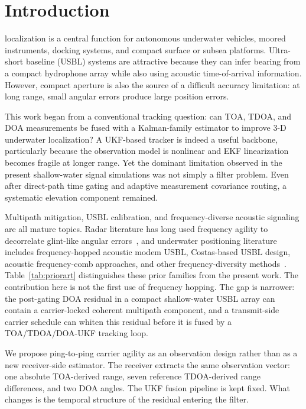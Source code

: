 \documentclass[journal]{IEEEtran}
\begin{document}
\section{Introduction}
 localization is a central function for autonomous underwater
vehicles, moored instruments, docking systems, and compact surface or subsea platforms.
Ultra-short baseline (USBL) systems are attractive because they can infer bearing from a compact
hydrophone array while also using acoustic time-of-arrival information. However, compact aperture
is also the source of a difficult accuracy limitation: at long range, small angular errors
produce large position errors.

This work began from a conventional tracking question: can TOA, TDOA, and DOA measurements be
fused with a Kalman-family estimator to improve 3-D underwater localization? A UKF-based tracker
is indeed a useful backbone, particularly because the observation model is nonlinear and EKF
linearization becomes fragile at longer range. Yet the dominant limitation observed in the
present shallow-water signal simulations was not simply a filter problem. Even after direct-path
time gating and adaptive measurement covariance routing, a systematic elevation component
remained.

Multipath mitigation, USBL calibration, and frequency-diverse acoustic signaling are all mature
topics. Radar literature has long used frequency agility to decorrelate glint-like angular
errors~\cite{Loomis1974FrequencyAgilityGlint}, and underwater positioning literature includes
frequency-hopped acoustic modem USBL, Costas-based USBL design, acoustic frequency-comb
approaches, and other frequency-diversity methods~\cite{Beaujean2007FrequencyHoppedUSBL,
Nhat2022CostasUSBL, Qian2025FrequencyCombIUSBL}. Table~\ref{tab:priorart} distinguishes these
prior families from the present work. The contribution here is not the first use of frequency
hopping. The gap is narrower: the post-gating DOA residual in a compact shallow-water USBL array
can contain a carrier-locked coherent multipath component, and a transmit-side carrier schedule
can whiten this residual before it is fused by a TOA/TDOA/DOA-UKF tracking loop.

We propose ping-to-ping carrier agility as an observation design rather than as a new
receiver-side estimator. The receiver extracts the same observation vector: one absolute
TOA-derived range, seven reference TDOA-derived range differences, and two DOA angles. The UKF
fusion pipeline is kept fixed. What changes is the temporal structure of the residual entering
the filter.
\end{document}
